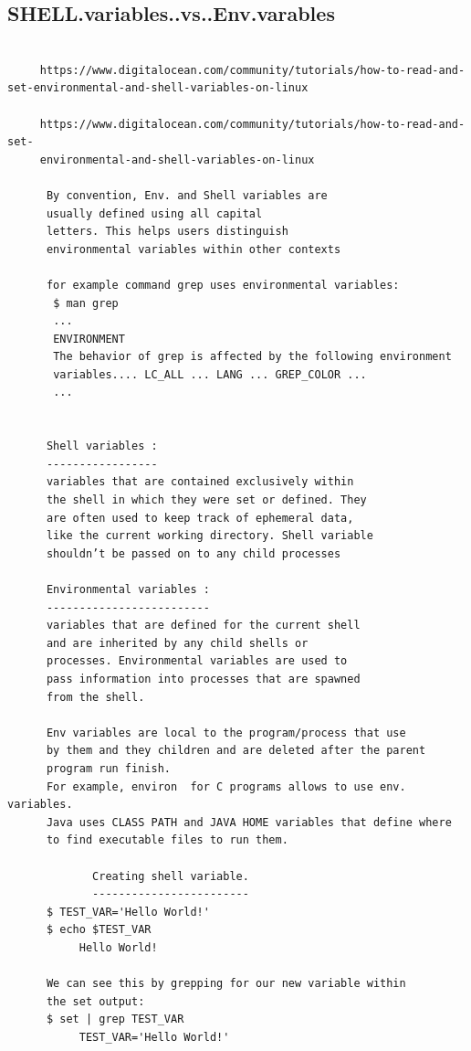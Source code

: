 \documentclass[a4paper,12pt]{article}
\begin{document}
\subsection{SHELL.variables..vs..Env.varables}
\begin{verbatim}

     https://www.digitalocean.com/community/tutorials/how-to-read-and-set-environmental-and-shell-variables-on-linux

     https://www.digitalocean.com/community/tutorials/how-to-read-and-set-             
     environmental-and-shell-variables-on-linux

      By convention, Env. and Shell variables are  
      usually defined using all capital 
      letters. This helps users distinguish 
      environmental variables within other contexts

      for example command grep uses environmental variables:
       $ man grep
       ...
       ENVIRONMENT
       The behavior of grep is affected by the following environment
       variables.... LC_ALL ... LANG ... GREP_COLOR ...
       ...


      Shell variables :
      -----------------
      variables that are contained exclusively within
      the shell in which they were set or defined. They 
      are often used to keep track of ephemeral data, 
      like the current working directory. Shell variable 
      shouldn’t be passed on to any child processes

      Environmental variables : 
      -------------------------
      variables that are defined for the current shell 
      and are inherited by any child shells or 
      processes. Environmental variables are used to 
      pass information into processes that are spawned 
      from the shell.
      
      Env variables are local to the program/process that use
      by them and they children and are deleted after the parent 
      program run finish.
      For example, environ  for C programs allows to use env. variables. 
      Java uses CLASS PATH and JAVA HOME variables that define where
      to find executable files to run them.

             Creating shell variable.
             ------------------------
      $ TEST_VAR='Hello World!'
      $ echo $TEST_VAR
           Hello World!

      We can see this by grepping for our new variable within  
      the set output:
      $ set | grep TEST_VAR
           TEST_VAR='Hello World!'


\end{verbatim}
\end{document}
